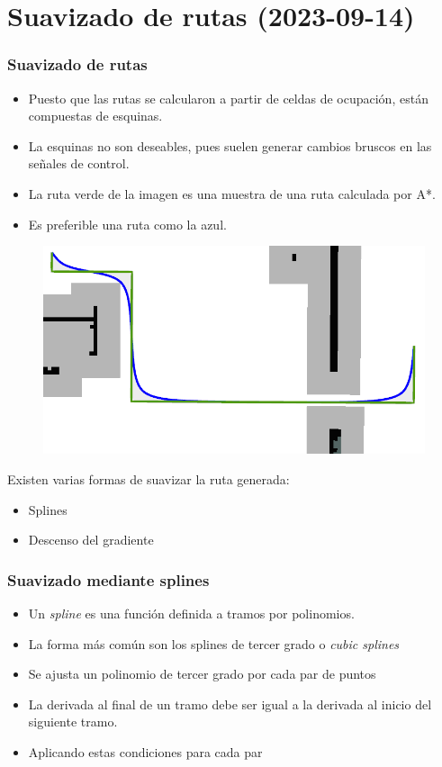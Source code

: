 \section{Suavizado de rutas (2023-09-14)}
\begin{frame}\frametitle{Suavizado de rutas}
  \begin{itemize}
  \item Puesto que las rutas se calcularon a partir de celdas de ocupación, están compuestas de esquinas.
  \item La esquinas no son deseables, pues suelen generar cambios bruscos en las señales de control.
  \item La ruta verde de la imagen es una muestra de una ruta calculada por A*.
  \item Es preferible una ruta como la azul. 
  \end{itemize}
  \begin{figure}
    \centering
    \includegraphics[height=0.45\textheight]{Figures/PathSmoothingExample.png}
  \end{figure}
  Existen varias formas de suavizar la ruta generada:
  \begin{itemize}
  \item Splines
  \item Descenso del gradiente
  \end{itemize}
\end{frame}

\begin{frame}\frametitle{Suavizado mediante splines}
  \begin{itemize}
  \item Un \textit{spline} es una función definida a tramos por polinomios.
  \item La forma más común son los splines de tercer grado o \textit{cubic splines}
  \item Se ajusta un polinomio de tercer grado por cada par de puntos
  \item La derivada al final de un tramo debe ser igual a la derivada al inicio del siguiente tramo.
  \item Aplicando estas condiciones para cada par 
  \end{itemize}
  
\end{frame}


